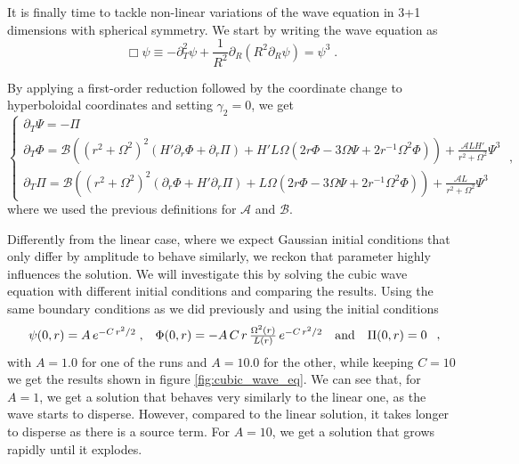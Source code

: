 It is finally time to tackle non-linear variations of the wave equation in 3+1 dimensions with spherical symmetry. We start by writing the wave equation as
%
\begin{equation}
    \Box \psi \equiv - \partial_T^2 \psi + \frac{1}{R^2} \partial_R\left( R^2 \partial_R \psi\right) = \psi^3 \;.
\end{equation}

By applying a first-order reduction followed by the coordinate change to hyperboloidal coordinates and setting $\gamma_2=0$, we get
%
\begin{equation}
    \left\{ \begin{array}{l} 
        \partial_T \Psi = - \Pi \\ 
        \partial_T \Phi = \mathcal{B}\left((r^2 + \Omega^2)^2 \left(H' \partial_r \Phi + \partial_r\Pi\right) + H' L \Omega \left( 2r\Phi - 3 \Omega \Psi + 2 r^{-1} \Omega^2 \Phi\right)\right) + \frac{\mathcal{A} L H'}{r^2 + \Omega^2} \Psi^3\\
        \partial_T \Pi = \mathcal{B}\left((r^2 + \Omega^2)^2 \left(\partial_r \Phi + H' \partial_r\Pi\right) + L \Omega \left( 2r\Phi - 3 \Omega \Psi + 2 r^{-1} \Omega^2 \Phi\right)\right) + \frac{\mathcal{A} L}{r^2 + \Omega^2} \Psi^3
        \end{array} \right. \; ,
\end{equation}
%
where we used the previous definitions for $\mathcal{A}$ and $\mathcal{B}$. 

Differently from the linear case, where we expect Gaussian initial conditions that only differ by amplitude to behave similarly, we reckon that parameter highly influences the solution. We will investigate this by solving the cubic wave equation with different initial conditions and comparing the results. Using the same boundary conditions as we did previously and using the initial conditions
%
\begin{equation}
    \begin{array}{c c c c}
        \psi(0,r) = A \, e^{-C \, r^2/2} \; , & \Phi(0,r) = - A \,C \, r \, \frac{\Omega^2(r)}{L(r)} \, e^{-C \, r^2/2} & \text{and} & \Pi(0,r) = 0
    \end{array} \; ,
    \label{eq:cubic_wave_equation-2nd_order_initial_conditions}
\end{equation}
%
with $A = 1.0$ for one of the runs and $A = 10.0$ for the other, while keeping $C = 10$ we get the results shown in figure \ref{fig:cubic_wave_eq}. We can see that, for $A = 1$, we get a solution that behaves very similarly to the linear one, as the wave starts to disperse. However, compared to the linear solution, it takes longer to disperse as there is a source term. For $A = 10$, we get a solution that grows rapidly until it explodes.

